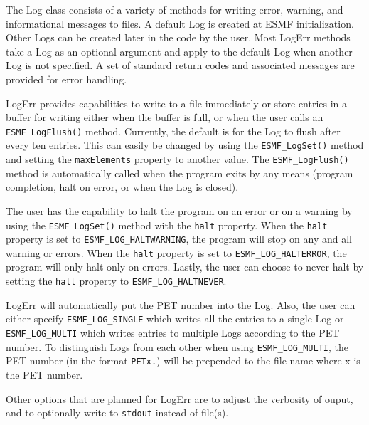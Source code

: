 



The Log class consists of a variety of methods for writing error, warning, and
informational messages to files.  A default Log is created at ESMF
initialization.  Other Logs can be created later in the code by the user.  Most
LogErr methods take a Log as an optional argument and apply to the default Log
when another Log is not specified.  A set of standard return codes and
associated messages are provided for error handling.  

LogErr provides capabilities to write to a file immediately or store entries in
a buffer for writing either when the buffer is full, or when the user calls an 
{\tt ESMF\_LogFlush()} method.  Currently, the default is for the Log to flush
after every ten entries.  This can easily be changed by using the 
{\tt ESMF\_LogSet()} method and setting the {\tt maxElements} property to 
another value.  The {\tt ESMF\_LogFlush()} method is automatically called when 
the program exits by any means (program completion, halt on error, or when the
Log is closed).

The user has the capability to halt the program on an error or on a warning by
using the {\tt ESMF\_LogSet()} method with the {\tt halt} property.  When the 
{\tt halt} property is set to {\tt ESMF\_LOG\_HALTWARNING}, the program will 
stop on any and all warning or errors.  When the {\tt halt} property is set to 
{\tt ESMF\_LOG\_HALTERROR}, the program will only halt only on errors.  Lastly,
the user can choose to never halt by setting the {\tt halt} property to 
{\tt ESMF\_LOG\_HALTNEVER}.

LogErr will automatically put the PET number into the Log.  Also, the user can 
either specify {\tt ESMF\_LOG\_SINGLE} which writes all the entries to a single 
Log or {\tt ESMF\_LOG\_MULTI} which writes entries to multiple Logs according to 
the PET number.  To distinguish Logs from each other when using 
{\tt ESMF\_LOG\_MULTI}, the PET number (in the format {\tt PETx.}) will be 
prepended to the file name where x is the PET number.
 
Other options that are planned for LogErr are to adjust the verbosity of ouput, 
and to optionally write to {\tt stdout} instead of file(s).




